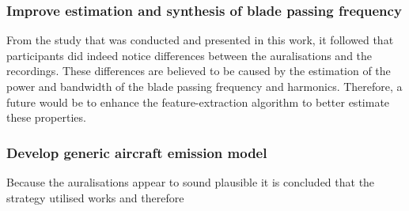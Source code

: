 \subsubsection*{Improve estimation and synthesis of blade passing frequency}
From the study that was conducted and presented in this work, it followed that
participants did indeed notice differences between the auralisations and the
recordings. These differences are believed to be caused by the estimation of the
power and bandwidth of the blade passing frequency and harmonics. Therefore, a
future would be to enhance the feature-extraction algorithm to better estimate
these properties.


\subsubsection*{Develop generic aircraft emission model}
Because the auralisations appear to sound plausible it is concluded that the strategy
utilised works and therefore


